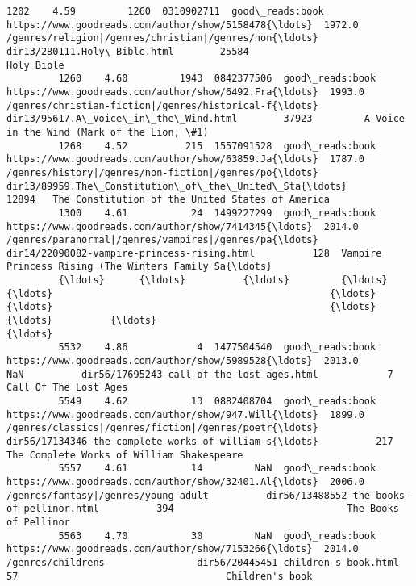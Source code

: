 \documentclass[11pt]{article}
\begin{document}
\begin{Verbatim}[commandchars=\\\{\}]
         1202    4.59         1260  0310902711  good\_reads:book  https://www.goodreads.com/author/show/5158478{\ldots}  1972.0  /genres/religion|/genres/christian|/genres/non{\ldots}                       dir13/280111.Holy\_Bible.html        25584                                         Holy Bible
         1260    4.60         1943  0842377506  good\_reads:book  https://www.goodreads.com/author/show/6492.Fra{\ldots}  1993.0  /genres/christian-fiction|/genres/historical-f{\ldots}               dir13/95617.A\_Voice\_in\_the\_Wind.html        37923         A Voice in the Wind (Mark of the Lion, \#1)
         1268    4.52          215  1557091528  good\_reads:book  https://www.goodreads.com/author/show/63859.Ja{\ldots}  1787.0  /genres/history|/genres/non-fiction|/genres/po{\ldots}  dir13/89959.The\_Constitution\_of\_the\_United\_Sta{\ldots}        12894   The Constitution of the United States of America
         1300    4.61           24  1499227299  good\_reads:book  https://www.goodreads.com/author/show/7414345{\ldots}  2014.0  /genres/paranormal|/genres/vampires|/genres/pa{\ldots}        dir14/22090082-vampire-princess-rising.html          128  Vampire Princess Rising (The Winters Family Sa{\ldots}
         {\ldots}      {\ldots}          {\ldots}         {\ldots}              {\ldots}                                                {\ldots}     {\ldots}                                                {\ldots}                                                {\ldots}          {\ldots}                                                {\ldots}
         5532    4.86            4  1477504540  good\_reads:book  https://www.goodreads.com/author/show/5989528{\ldots}  2013.0                                                NaN          dir56/17695243-call-of-the-lost-ages.html            7                              Call Of The Lost Ages
         5549    4.62           13  0882408704  good\_reads:book  https://www.goodreads.com/author/show/947.Will{\ldots}  1899.0  /genres/classics|/genres/fiction|/genres/poetr{\ldots}  dir56/17134346-the-complete-works-of-william-s{\ldots}          217          The Complete Works of William Shakespeare
         5557    4.61           14         NaN  good\_reads:book  https://www.goodreads.com/author/show/32401.Al{\ldots}  2006.0                /genres/fantasy|/genres/young-adult          dir56/13488552-the-books-of-pellinor.html          394                              The Books of Pellinor
         5563    4.70           30         NaN  good\_reads:book  https://www.goodreads.com/author/show/7153266{\ldots}  2014.0                                  /genres/childrens                dir56/20445451-children-s-book.html           57                                    Children's book

\end{Verbatim}
\end{document}
